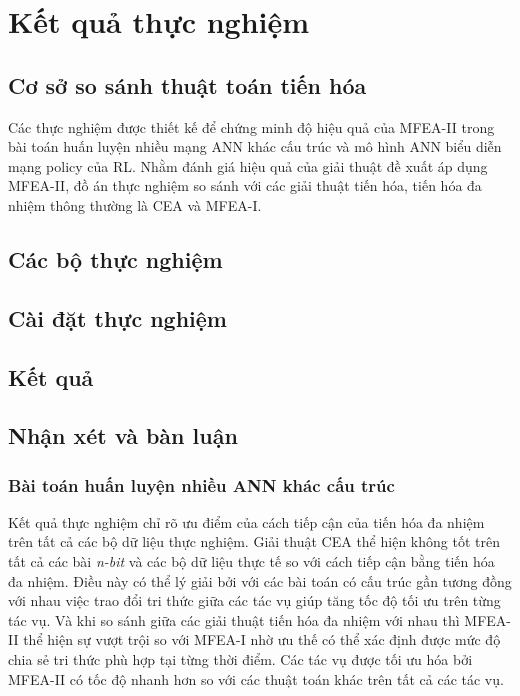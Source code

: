 \chapter{Kết quả thực nghiệm}
\label{chap:result}

\section{Cơ sở so sánh thuật toán tiến hóa}
Các thực nghiệm được thiết kế để chứng minh độ hiệu quả của MFEA-II trong bài toán huấn luyện nhiều mạng ANN khác cấu trúc và mô hình ANN biểu diễn mạng policy của RL. Nhằm đánh giá hiệu quả của giải thuật đề xuất áp dụng MFEA-II, đồ án thực nghiệm so sánh với các giải thuật tiến hóa, tiến hóa đa nhiệm thông thường là CEA và MFEA-I. 
\section{Các bộ thực nghiệm}

\section{Cài đặt thực nghiệm}

\section{Kết quả}

\pagebreak
\section{Nhận xét và bàn luận}
\subsection{Bài toán huấn luyện nhiều ANN khác cấu trúc}

Kết quả thực nghiệm chỉ rõ ưu điểm của cách tiếp cận của tiến hóa đa nhiệm trên tất cả các bộ dữ liệu thực nghiệm. Giải thuật CEA thể hiện không tốt trên tất cả các bài \emph{n-bit} và các bộ dữ liệu thực tế so với cách tiếp cận bằng tiến hóa đa nhiệm. Điều này có thể lý giải bởi với các bài toán có cấu trúc gần tương đồng với nhau việc trao đổi tri thức giữa các tác vụ giúp tăng tốc độ tối ưu trên từng tác vụ. Và khi so sánh giữa các giải thuật tiến hóa đa nhiệm với nhau thì MFEA-II thể hiện sự vượt trội so với MFEA-I nhờ ưu thế có thể xác định được mức độ chia sẻ tri thức phù hợp tại từng thời điểm. Các tác vụ được tối ưu hóa bởi MFEA-II có tốc độ nhanh hơn so với các thuật toán khác trên tất cả các tác vụ.

